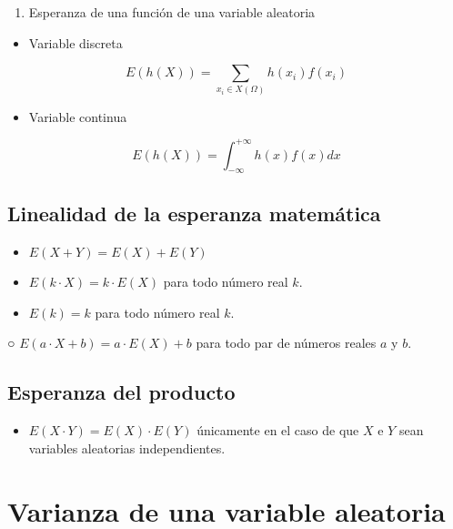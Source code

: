 \documentclass[
  a4paper,
  DIV=11,
  numbers=noendperiod]{scrreprt}
\providecommand{\tightlist}{%
  \setlength{\itemsep}{0pt}\setlength{\parskip}{0pt}}\usepackage{longtable,booktabs,array}
\begin{document}
\begin{enumerate}
\def\labelenumi{\arabic{enumi}.}
\tightlist
\item
  Esperanza de una función de una variable aleatoria
\end{enumerate}

\begin{itemize}
\tightlist
\item
  Variable discreta
\end{itemize}

\[
E(h(X))=\sum_{x_{i} \in X(\Omega)} h\left(x_{i}\right) f\left(x_{i}\right)
\]

\begin{itemize}
\tightlist
\item
  Variable continua
\end{itemize}

\[
E(h(X))=\int_{-\infty}^{+\infty} h(x) f(x) d x
\]

\subsection{Linealidad de la esperanza
matemática}\label{linealidad-de-la-esperanza-matemuxe1tica}

\begin{itemize}
\tightlist
\item
  \(E(X+Y)=E(X)+E(Y)\)
\item
  \(E(k \cdot X)=k \cdot E(X)\) para todo número real \(k\).
\item
  \(E(k)=k\) para todo número real \(k\).
\end{itemize}

○ \(E(a \cdot X+b)=a \cdot E(X)+b\) para todo par de números reales
\(a\) y \(b\).

\subsection{Esperanza del producto}\label{esperanza-del-producto}

\begin{itemize}
\tightlist
\item
  \(E(X \cdot Y)=E(X) \cdot E(Y)\) únicamente en el caso de que \(X\) e
  \(Y\) sean variables aleatorias independientes.
\end{itemize}

\section{Varianza de una variable
aleatoria}\label{varianza-de-una-variable-aleatoria}
\end{document}
